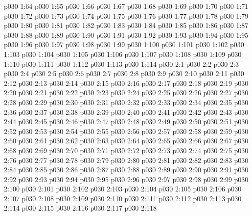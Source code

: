 \vs p030 1:64 
\vs p030 1:65 
\vs p030 1:66 
\vs p030 1:67 
\vs p030 1:68 
\vs p030 1:69 
\vs p030 1:70 
\vs p030 1:71 
\vs p030 1:72 
\vs p030 1:73 
\vs p030 1:74 
\vs p030 1:75 
\vs p030 1:76 
\vs p030 1:77 
\vs p030 1:78 
\vs p030 1:79 
\vs p030 1:80 
\vs p030 1:81 
\vs p030 1:82 
\vs p030 1:83 
\vs p030 1:84 
\vs p030 1:85 
\vs p030 1:86 
\vs p030 1:87 
\vs p030 1:88 
\vs p030 1:89 
\vs p030 1:90 
\vs p030 1:91 
\vs p030 1:92 
\vs p030 1:93 
\vs p030 1:94 
\vs p030 1:95 
\vs p030 1:96 
\vs p030 1:97 
\vs p030 1:98 
\vs p030 1:99 \pc 
\vs p030 1:100 
\vs p030 1:101 
\vs p030 1:102 
\vs p030 1:103 
\vs p030 1:104 
\vs p030 1:105 
\vs p030 1:106 
\vs p030 1:107 
\vs p030 1:108 
\vs p030 1:109 
\vs p030 1:110 
\vs p030 1:111 
\vs p030 1:112 \pc 
\vs p030 1:113 
\vs p030 1:114 \pc 
{}
\vs p030 2:1 
\vs p030 2:2 
\vs p030 2:3 
\vs p030 2:4 
\vs p030 2:5 
\vs p030 2:6 
\vs p030 2:7 
\vs p030 2:8 
\vs p030 2:9 \pc 
\vs p030 2:10 
\vs p030 2:11 
\vs p030 2:12 
\vs p030 2:13 
\vs p030 2:14 
\vs p030 2:15 
\vs p030 2:16 
\vs p030 2:17 
\vs p030 2:18 
\vs p030 2:19 
\vs p030 2:20 
\vs p030 2:21 
\vs p030 2:22 
\vs p030 2:23 
\vs p030 2:24 
\vs p030 2:25 
\vs p030 2:26 
\vs p030 2:27 
\vs p030 2:28 
\vs p030 2:29 
\vs p030 2:30 
\vs p030 2:31 
\vs p030 2:32 
\vs p030 2:33 
\vs p030 2:34 
\vs p030 2:35 
\vs p030 2:36 
\vs p030 2:37 
\vs p030 2:38 
\vs p030 2:39 
\vs p030 2:40 
\vs p030 2:41 
\vs p030 2:42 
\vs p030 2:43 
\vs p030 2:44 
\vs p030 2:45 
\vs p030 2:46 
\vs p030 2:47 
\vs p030 2:48 
\vs p030 2:49 
\vs p030 2:50 
\vs p030 2:51 
\vs p030 2:52 
\vs p030 2:53 
\vs p030 2:54 
\vs p030 2:55 
\vs p030 2:56 
\vs p030 2:57 
\vs p030 2:58 
\vs p030 2:59 
\vs p030 2:60 
\vs p030 2:61 
\vs p030 2:62 
\vs p030 2:63 
\vs p030 2:64 
\vs p030 2:65 
\vs p030 2:66 
\vs p030 2:67 
\vs p030 2:68 
\vs p030 2:69 
\vs p030 2:70 
\vs p030 2:71 
\vs p030 2:72 
\vs p030 2:73 
\vs p030 2:74 
\vs p030 2:75 
\vs p030 2:76 
\vs p030 2:77 
\vs p030 2:78 
\vs p030 2:79 
\vs p030 2:80 
\vs p030 2:81 
\vs p030 2:82 
\vs p030 2:83 
\vs p030 2:84 
\vs p030 2:85 
\vs p030 2:86 
\vs p030 2:87 
\vs p030 2:88 
\vs p030 2:89 
\vs p030 2:90 
\vs p030 2:91 
\vs p030 2:92 
\vs p030 2:93 
\vs p030 2:94 
\vs p030 2:95 
\vs p030 2:96 
\vs p030 2:97 
\vs p030 2:98 
\vs p030 2:99 
\vs p030 2:100 
\vs p030 2:101 
\vs p030 2:102 
\vs p030 2:103 
\vs p030 2:104 
\vs p030 2:105 
\vs p030 2:106 
\vs p030 2:107 
\vs p030 2:108 
\vs p030 2:109 
\vs p030 2:110 
\vs p030 2:111 
\vs p030 2:112 
\vs p030 2:113 
\vs p030 2:114 
\vs p030 2:115 
\vs p030 2:116 
\vs p030 2:117 
\vs p030 2:118 
